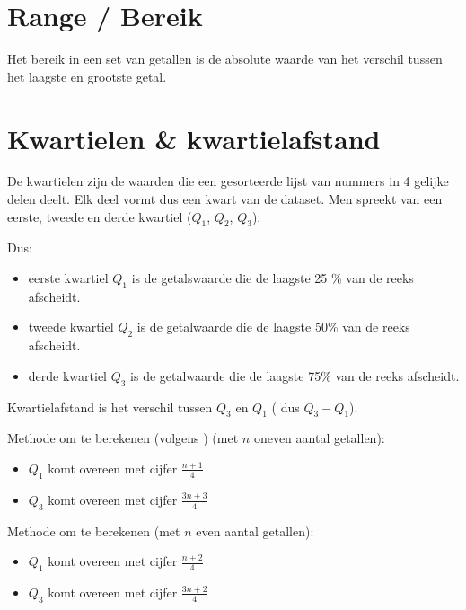 \section{Range / Bereik}
\begin{definition}[Bereik]
  Het   bereik in een set van getallen is de absolute waarde van het verschil tussen het laagste en grootste getal.
\end{definition}

\section{Kwartielen \& kwartielafstand}
\begin{definition}
  De  kwartielen zijn de waarden die een gesorteerde lijst van nummers in 4 gelijke delen deelt. Elk deel vormt dus een kwart van de dataset. Men spreekt van een eerste, tweede en derde kwartiel ($Q_{1}$, $Q_{2}$, $Q_{3}$).
\end{definition}

Dus:
\begin{itemize}
  \item eerste kwartiel $Q_{1}$ is de getalswaarde die de laagste 25 \% van de reeks afscheidt.
  \item tweede kwartiel $Q_{2}$ is de getalwaarde die de laagste 50\% van de reeks afscheidt.
  \item derde kwartiel $Q_{3}$ is de getalwaarde die de laagste 75\% van de reeks afscheidt.
\end{itemize}

\begin{definition}
   Kwartielafstand is het verschil tussen $Q_{3}$ en $Q_{1}$ ( dus $Q_{3} - Q_{1}$).
\end{definition}

Methode om te berekenen (volgens \textcite{Moore2002}) (met $n$ oneven aantal getallen):
\begin{itemize}
  \item $Q_{1}$ komt overeen met cijfer $\frac{n+1}{4}$
  \item $Q_{3}$ komt overeen met cijfer $\frac{3n+3}{4}$
\end{itemize}

Methode om te berekenen (met $n$ even aantal getallen):
\begin{itemize}
  \item $Q_{1}$ komt overeen met cijfer $\frac{n+2}{4}$
  \item $Q_{3}$ komt overeen met cijfer $\frac{3n+2}{4}$
\end{itemize}

